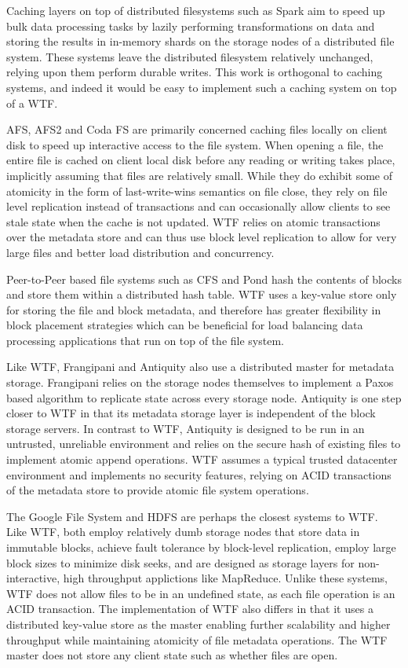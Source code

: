 \documentclass[letterpaper,twocolumn,10pt]{article}
\begin{document}
Caching layers on top of distributed filesystems such as
Spark aim to speed up bulk data processing tasks by 
lazily performing transformations on data and storing the
results in in-memory shards on the storage nodes of a 
distributed file system.  These systems leave the
distributed filesystem relatively unchanged, relying upon
them perform durable writes.  This work is orthogonal
to caching systems, and indeed it would be easy to implement such a
caching system on top of a WTF.

AFS, AFS2 and Coda FS are primarily concerned caching files
locally on client disk to speed up interactive access to
the file system.  When opening a file, the entire file is cached
on client local disk before any reading or writing takes place, implicitly
assuming that files are relatively small.  While they do exhibit some 
of atomicity in the form of last-write-wins
semantics on file close, they rely on file level replication instead
of transactions and can occasionally allow clients to see stale state
when the cache is not updated.  WTF relies on atomic transactions over the metadata
store and can thus use block level replication to allow for very large
files and better load distribution and concurrency.  

Peer-to-Peer based file systems such as CFS and Pond 
hash the contents
of blocks and store them within a distributed hash table.  WTF
uses a key-value store only for storing the file and block
metadata, and therefore has greater flexibility in block placement
strategies which can be beneficial for load balancing data
processing applications that run on top of the file system.

Like WTF, Frangipani and Antiquity also use a distributed master for 
metadata storage.  
Frangipani relies on the storage nodes themselves to implement
a Paxos based algorithm to replicate state across every storage
node.  Antiquity is one step closer to WTF in that its metadata
storage layer is
independent of the block storage servers.  In contrast to  
WTF, Antiquity is designed to be run in an untrusted, unreliable 
environment and relies on the secure hash of existing files
to implement atomic append operations.  WTF assumes a typical 
trusted datacenter environment and implements no security features,
relying on ACID transactions of the metadata store to provide
atomic file system operations. 

The Google File System and HDFS are perhaps the closest systems
to WTF.  Like WTF, both employ relatively dumb storage nodes
that store data in immutable blocks,
achieve fault tolerance by block-level replication, employ large block sizes
to minimize disk seeks, and are designed as storage layers
for non-interactive, high throughput applictions like MapReduce.
Unlike these systems, WTF does not allow files to be in an undefined
state, as each file operation is an ACID transaction.  The implementation
of WTF also differs in that it uses a distributed
key-value store as the master enabling further scalability and higher
throughput while maintaining atomicity of file metadata operations.
The WTF master does not store any client state such
as whether files are open.
\end{document}
